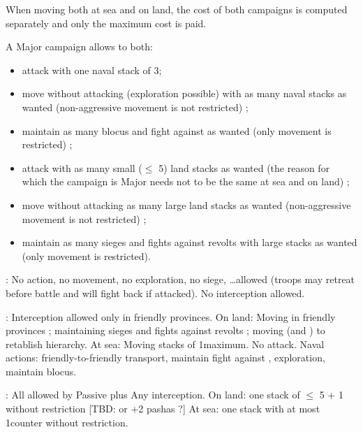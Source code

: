 \aparag When moving both at sea and on land, the cost of both campaigns is
computed separately and only the maximum cost is paid.
\begin{exemple}
  A Major campaign allows to both:
  \begin{itemize}
  \item attack with one naval stack of 3\FLEET ;
  \item move without attacking (exploration possible) with as many naval
    stacks as wanted (non-aggressive movement is not restricted) ;
  \item maintain as many blocus and fight against \corsaire as wanted (only
    movement is restricted) ;
  \item attack with as many small ($\leq$ 5\LD) land stacks as wanted (the
    reason for which the campaign is Major needs not to be the same at sea and
    on land) ;
  \item move without attacking as many large land stacks as wanted
    (non-aggressive movement is not restricted) ;
  \item maintain as many sieges and fights against revolts with large stacks as
    wanted (only movement is restricted).
  \end{itemize}
\end{exemple}

\ducats: No action, no movement, no exploration, no siege,
\ldots allowed (troops may retreat before battle and will fight back if
attacked). No interception allowed.

\ducats: 
\bparag Interception allowed only in friendly provinces.
\bparag On land: Moving in friendly provinces ; maintaining sieges and fights
against revolts ; moving \LeaderG (and \LeaderC) to retablish hierarchy.
\bparag At sea: Moving stacks of 1\FLEET maximum. No attack.
\bparag Naval actions: friendly-to-friendly transport, maintain fight against
\corsaire, exploration, maintain blocus.
      
\ducats: All allowed by Passive plus
\bparag Any interception.
\bparag On land: one stack of $\leq$ 5 \LD + 1 \Pasha without restriction
[TBD: or +2 pashas ?]
\bparag At sea: one stack with at most 1\FLEET counter without restriction.

